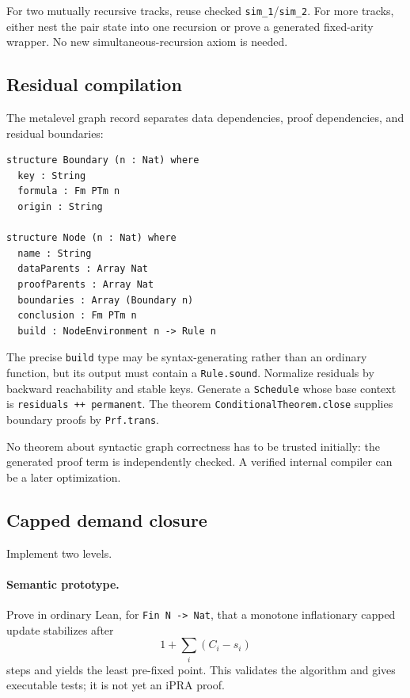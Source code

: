 For two mutually recursive tracks, reuse checked \texttt{sim\_1}/\texttt{sim\_2}.  For more tracks, either nest the pair state into one recursion or prove a generated fixed-arity wrapper.  No new simultaneous-recursion axiom is needed.

\subsection{Residual compilation}

The metalevel graph record separates data dependencies, proof dependencies, and residual boundaries:

\begin{lstlisting}
structure Boundary (n : Nat) where
  key : String
  formula : Fm PTm n
  origin : String

structure Node (n : Nat) where
  name : String
  dataParents : Array Nat
  proofParents : Array Nat
  boundaries : Array (Boundary n)
  conclusion : Fm PTm n
  build : NodeEnvironment n -> Rule n
\end{lstlisting}
The precise \texttt{build} type may be syntax-generating rather than an ordinary function, but its output must contain a \texttt{Rule.sound}.  Normalize residuals by backward reachability and stable keys.  Generate a \texttt{Schedule} whose base context is \texttt{residuals ++ permanent}.  The theorem \texttt{ConditionalTheorem.close} supplies boundary proofs by \texttt{Prf.trans}.

No theorem about syntactic graph correctness has to be trusted initially: the generated proof term is independently checked.  A verified internal compiler can be a later optimization.

\subsection{Capped demand closure}

Implement two levels.

\paragraph{Semantic prototype.}
Prove in ordinary Lean, for \texttt{Fin N -> Nat}, that a monotone inflationary capped update stabilizes after
\[
  1+\sum_i(C_i-s_i)
\]
steps and yields the least pre-fixed point.  This validates the algorithm and gives executable tests; it is not yet an iPRA proof.

